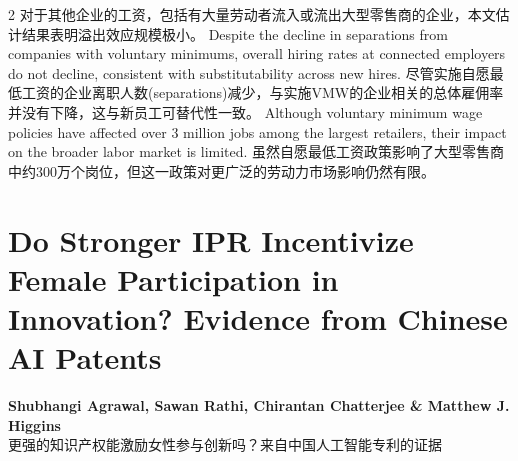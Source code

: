\documentclass[cn,hazy,blue,14pt,screen]{elegantnote}
\begin{document}
\begin{paracol}{2}
	\switchcolumn
	对于其他企业的工资，包括有大量劳动者流入或流出大型零售商的企业，本文估计结果表明溢出效应规模极小。
	\switchcolumn*
	Despite the decline in separations from companies with voluntary minimums, overall hiring rates at connected employers do not decline, consistent with substitutability across new hires. 
		\switchcolumn
	尽管实施自愿最低工资的企业离职人数(separations)减少，与实施VMW的企业相关的总体雇佣率并没有下降，这与新员工可替代性一致。
	\switchcolumn*
	Although voluntary minimum wage policies have affected over 3 million jobs among the largest retailers, their impact on the broader labor market is limited.
	\switchcolumn
	虽然自愿最低工资政策影响了大型零售商中约300万个岗位，但这一政策对更广泛的劳动力市场影响仍然有限。
	
\end{paracol}

\section{Do Stronger IPR Incentivize Female Participation in Innovation? Evidence from Chinese AI Patents}
\begin{center}
	\textbf{Shubhangi Agrawal, Sawan Rathi, Chirantan Chatterjee \& Matthew J. Higgins}\\
	更强的知识产权能激励女性参与创新吗？来自中国人工智能专利的证据
\end{center}
\end{document}
